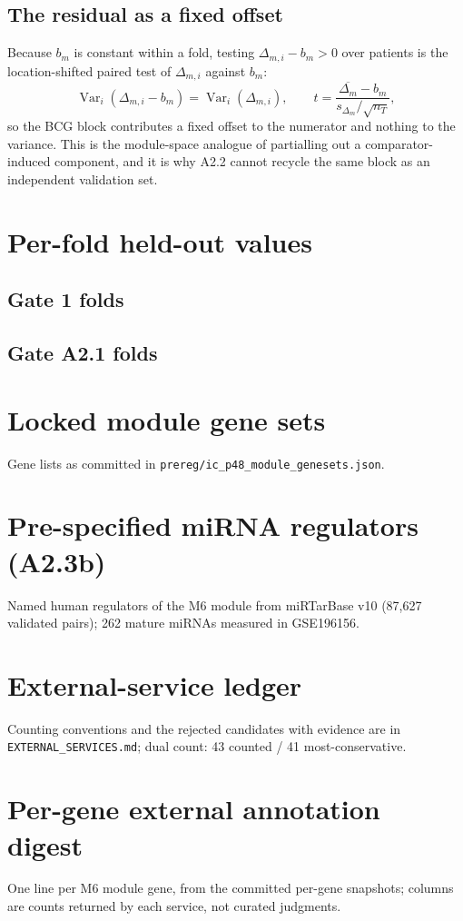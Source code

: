 \documentclass[11pt,a4paper]{article}
\begin{document}
\subsection{The residual as a fixed offset}
Because $b_m$ is constant within a fold, testing $\Delta_{m,i}-b_m>0$ over
patients is the location-shifted paired test of $\Delta_{m,i}$ against $b_m$:
\begin{equation}
\operatorname{Var}_i(\Delta_{m,i}-b_m)=\operatorname{Var}_i(\Delta_{m,i}),
\qquad
t=\frac{\overline{\Delta_m}-b_m}{s_{\Delta_m}/\sqrt{n_T}},
\end{equation}
so the BCG block contributes a fixed offset to the numerator and nothing to
the variance. This is the module-space analogue of partialling out a
comparator-induced component, and it is why A2.2 cannot recycle the same block
as an independent validation set.

\section{Per-fold held-out values}
\label{app:folds}
\subsection*{Gate 1 folds}

\subsection*{Gate A2.1 folds}


\section{Locked module gene sets}
\label{app:genes}
Gene lists as committed in \texttt{prereg/ic\_p48\_module\_genesets.json}.


\section{Pre-specified miRNA regulators (A2.3b)}
\label{app:regulators}
Named human regulators of the M6 module from miRTarBase v10 (87,627 validated
pairs); 262 mature miRNAs measured in GSE196156.


\section{External-service ledger}
\label{app:services}
Counting conventions and the rejected candidates with evidence are in
\texttt{EXTERNAL\_SERVICES.md}; dual count: 43 counted / 41 most-conservative.


\section{Per-gene external annotation digest}
\label{app:digest}
One line per M6 module gene, from the committed per-gene snapshots; columns are
counts returned by each service, not curated judgments.

\end{document}
